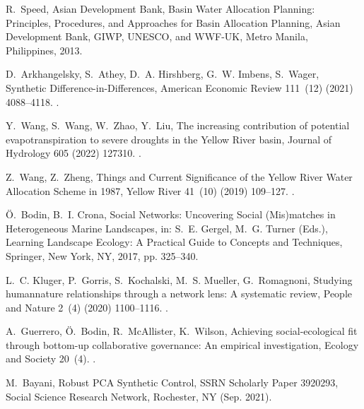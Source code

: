 \documentclass[preprint, 12pt]{elsarticle}
\begin{document}
\begin{thebibliography}{10}
R.~Speed, {Asian Development Bank}, Basin Water Allocation Planning:
  Principles, Procedures, and Approaches for Basin Allocation Planning, {Asian
  Development Bank, GIWP, UNESCO, and WWF-UK}, {Metro Manila, Philippines},
  2013.

D.~Arkhangelsky, S.~Athey, D.~A. Hirshberg, G.~W. Imbens, S.~Wager, Synthetic
  {{Difference-in-Differences}}, American Economic Review 111~(12) (2021)
  4088--4118.
\newblock \href {http://dx.doi.org/10.1257/aer.20190159}
  {}.

Y.~Wang, S.~Wang, W.~Zhao, Y.~Liu, The increasing contribution of potential
  evapotranspiration to severe droughts in the {{Yellow River}} basin, Journal
  of Hydrology 605 (2022) 127310.
\newblock \href {http://dx.doi.org/10.1016/j.jhydrol.2021.127310}
  {}.

Z.~Wang, Z.~Zheng, {Things and Current Significance of the Yellow River Water
  Allocation Scheme in 1987}, Yellow River 41~(10) (2019) 109--127.
\newblock \href {http://dx.doi.org/10.3969/j.issn.1000-1379.2019.10.019}
  {}.

{\"O}.~Bodin, B.~I. Crona, Social {{Networks}}: {{Uncovering
  Social}} ({{Mis}})matches in {{Heterogeneous Marine
  Landscapes}}, in: S.~E. Gergel, M.~G. Turner (Eds.), Learning {{Landscape
  Ecology}}: {{A Practical Guide}} to {{Concepts}} and {{Techniques}},
  {Springer}, {New York, NY}, 2017, pp. 325--340.

L.~C. Kluger, P.~Gorris, S.~Kochalski, M.~S. Mueller, G.~Romagnoni, Studying
  human\textendash nature relationships through a network lens: {{A}}
  systematic review, People and Nature 2~(4) (2020) 1100--1116.
\newblock \href {http://dx.doi.org/10.1002/pan3.10136}
  {}.

A.~Guerrero, {\"O}.~Bodin, R.~McAllister, K.~Wilson, Achieving
  social-ecological fit through bottom-up collaborative governance: An
  empirical investigation, Ecology and Society 20~(4).
\newblock \href {http://dx.doi.org/10.5751/ES-08035-200441}
  {}.

M.~Bayani, Robust {{PCA Synthetic Control}}, {{SSRN Scholarly Paper}} 3920293,
  {Social Science Research Network}, {Rochester, NY} (Sep. 2021).


\end{thebibliography}
\end{document}
